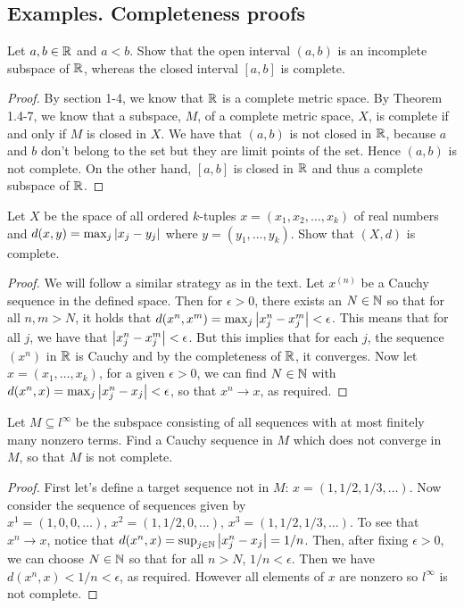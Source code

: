 \subsection{Examples. Completeness proofs}


\begin{exercise}{1}
Let $a,b\in\mathbb{R}$ and $a<b$. Show that the open interval $(a,b)$ is an incomplete subspace of $\mathbb{R}$, whereas the closed interval $[a,b]$ is complete.
\end{exercise}
\begin{proof}
By section 1-4, we know that $\mathbb{R}$ is a complete metric space. By Theorem 1.4-7, we know that a subspace, $M$, of a complete metric space, $X$, is complete if and only if $M$ is closed in $X$. We have that $(a,b)$ is not closed in $\mathbb{R}$, because $a$ and $b$ don't belong to the set but they are limit points of the set. Hence $(a,b)$ is not complete. On the other hand, $[a,b]$ is closed in $\mathbb{R}$ and thus a complete subspace of $\mathbb{R}$.
\end{proof}

\begin{exercise}{2}
Let $X$ be the space of all ordered $k$-tuples $x=(x_1,x_2,\dots,x_k)$ of real numbers and $d(x,y)=\max_j\left\lvert x_j-y_j\right\rvert$ where $y=(y_1,\dots,y_k)$. Show that $(X,d)$ is complete.
\end{exercise}
\begin{proof}
We will follow a similar strategy as in the text. Let $x^{(n)}$ be a Cauchy sequence in the defined space. Then for $\epsilon>0$, there exists an $N\in\mathbb{N}$ so that for all $n,m>N$, it holds that $d(x^n,x^m)=\max_j\left\lvert x^n_j-x^m_j\right\rvert<\epsilon$. This means that for all $j$, we have that $\left\lvert x^n_j-x^m_j\right\rvert<\epsilon$. But this implies that for each $j$, the sequence $(x^n)$ in $\mathbb{R}$ is Cauchy and by the completeness of $\mathbb{R}$, it converges. Now let $x=(x_1,\dots,x_k)$, for a given $\epsilon>0$, we can find $N\in\mathbb{N}$ with $d(x^n,x)=\max_j\left\lvert x^n_j-x_j\right\rvert<\epsilon$, so that $x^n\to x$, as required. 
\end{proof}

\begin{exercise}{3}
Let $M\subseteq l^\infty$ be the subspace consisting of all sequences with at most finitely many nonzero terms. Find a Cauchy sequence in $M$ which does not converge in $M$, so that $M$ is not complete.
\end{exercise}
\begin{proof}
First let's define a target sequence not in $M$: $x=(1,1/2,1/3,\dots)$. Now consider the sequence of sequences given by $x^1=(1,0,0,\dots),\,x^2=(1,1/2,0,\dots),\,x^3=(1,1/2,1/3,\dots)$. To see that $x^n\to x$, notice that $d(x^n,x)=\sup_{j\in\mathbb{N}}\left\lvert x^n_j-x_j\right\rvert=1/n$. Then, after fixing $\epsilon>0$, we can choose $N\in\mathbb{N}$ so that for all $n>N$, $1/n<\epsilon$. Then we have $d(x^n,x)<1/n<\epsilon$, as required. However all elements of $x$ are nonzero so $l^\infty$ is not complete.
\end{proof}

